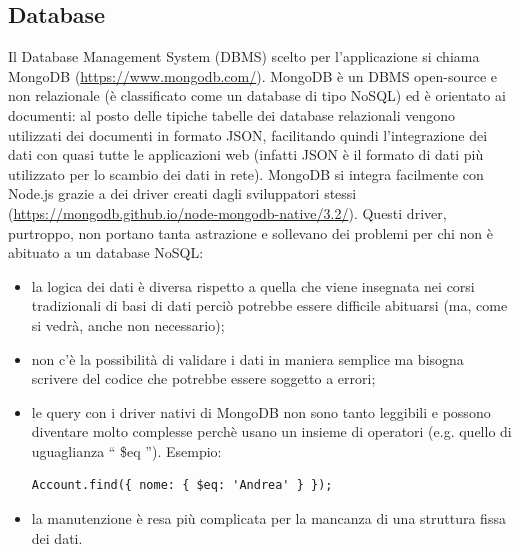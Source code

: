 \documentclass[12pt]{report}
\begin{document}
\subsection{Database}\label{sec:db}
%
Il {Database Management System} (DBMS) scelto per l'applicazione si chiama MongoDB (\url{https://www.mongodb.com/}). MongoDB è un DBMS open-source e non relazionale (è classificato come un database di tipo NoSQL) ed è orientato ai documenti: al posto delle tipiche tabelle dei database relazionali vengono utilizzati dei documenti in formato JSON, facilitando quindi l'integrazione dei dati con quasi tutte le applicazioni web (infatti JSON è il formato di dati più utilizzato per lo scambio dei dati in rete).
MongoDB si integra facilmente con Node.js grazie a dei driver creati dagli sviluppatori stessi (\url{https://mongodb.github.io/node-mongodb-native/3.2/}). Questi driver, purtroppo, non portano tanta astrazione e sollevano dei problemi per chi non è abituato a un database NoSQL: 
\begin{itemize}
	\item la logica dei dati è diversa rispetto a quella che viene insegnata nei corsi tradizionali di basi di dati perciò potrebbe essere difficile abituarsi (ma, come si vedrà, anche non necessario);
	\item non c'è la possibilità di validare i dati in maniera semplice ma bisogna scrivere del codice che potrebbe essere soggetto a errori;
	\item le query con i driver nativi di MongoDB non sono tanto leggibili e possono diventare molto complesse perchè usano un insieme di operatori (e.g. quello di uguaglianza \textquotedblleft{} \$eq \textquotedblright{}). Esempio:
\begin{lstlisting}
Account.find({ nome: { $eq: 'Andrea' } });
\end{lstlisting}

	\item la manutenzione è resa più complicata per la mancanza di una struttura fissa dei dati.
\end{itemize}
\end{document}
